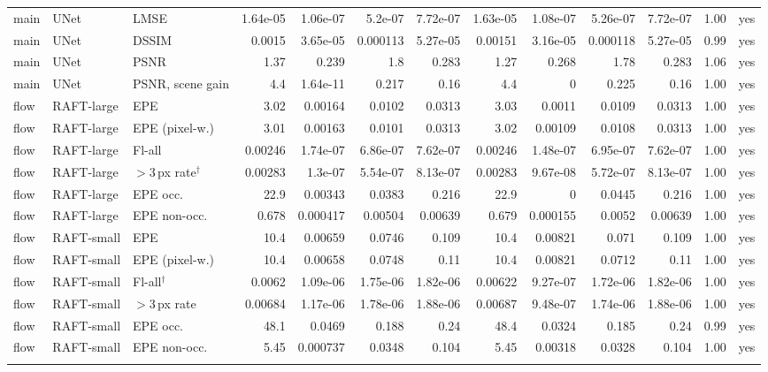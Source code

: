 \begin{table}[!htb]
{\begin{tabular}{lllrrrrrrrrrl}
main & UNet & LMSE & 1.64e-05 & 1.06e-07 & 5.2e-07 & 7.72e-07 & 1.63e-05 & 1.08e-07 & 5.26e-07 & 7.72e-07 & 1.00 & yes \\
main & UNet & DSSIM & 0.0015 & 3.65e-05 & 0.000113 & 5.27e-05 & 0.00151 & 3.16e-05 & 0.000118 & 5.27e-05 & 0.99 & yes \\
main & UNet & PSNR & 1.37 & 0.239 & 1.8 & 0.283 & 1.27 & 0.268 & 1.78 & 0.283 & 1.06 & yes \\
main & UNet & PSNR, scene gain & 4.4 & 1.64e-11 & 0.217 & 0.16 & 4.4 & 0 & 0.225 & 0.16 & 1.00 & yes \\
\addlinespace
flow & RAFT-large & EPE & 3.02 & 0.00164 & 0.0102 & 0.0313 & 3.03 & 0.0011 & 0.0109 & 0.0313 & 1.00 & yes \\
flow & RAFT-large & EPE (pixel-w.) & 3.01 & 0.00163 & 0.0101 & 0.0313 & 3.02 & 0.00109 & 0.0108 & 0.0313 & 1.00 & yes \\
flow & RAFT-large & Fl-all & 0.00246 & 1.74e-07 & 6.86e-07 & 7.62e-07 & 0.00246 & 1.48e-07 & 6.95e-07 & 7.62e-07 & 1.00 & yes \\
flow & RAFT-large & $>$3\,px rate$^\dagger$ & 0.00283 & 1.3e-07 & 5.54e-07 & 8.13e-07 & 0.00283 & 9.67e-08 & 5.72e-07 & 8.13e-07 & 1.00 & yes \\
flow & RAFT-large & EPE occ. & 22.9 & 0.00343 & 0.0383 & 0.216 & 22.9 & 0 & 0.0445 & 0.216 & 1.00 & yes \\
flow & RAFT-large & EPE non-occ. & 0.678 & 0.000417 & 0.00504 & 0.00639 & 0.679 & 0.000155 & 0.0052 & 0.00639 & 1.00 & yes \\
\addlinespace
flow & RAFT-small & EPE & 10.4 & 0.00659 & 0.0746 & 0.109 & 10.4 & 0.00821 & 0.071 & 0.109 & 1.00 & yes \\
flow & RAFT-small & EPE (pixel-w.) & 10.4 & 0.00658 & 0.0748 & 0.11 & 10.4 & 0.00821 & 0.0712 & 0.11 & 1.00 & yes \\
flow & RAFT-small & Fl-all$^\dagger$ & 0.0062 & 1.09e-06 & 1.75e-06 & 1.82e-06 & 0.00622 & 9.27e-07 & 1.72e-06 & 1.82e-06 & 1.00 & yes \\
flow & RAFT-small & $>$3\,px rate & 0.00684 & 1.17e-06 & 1.78e-06 & 1.88e-06 & 0.00687 & 9.48e-07 & 1.74e-06 & 1.88e-06 & 1.00 & yes \\
flow & RAFT-small & EPE occ. & 48.1 & 0.0469 & 0.188 & 0.24 & 48.4 & 0.0324 & 0.185 & 0.24 & 0.99 & yes \\
flow & RAFT-small & EPE non-occ. & 5.45 & 0.000737 & 0.0348 & 0.104 & 5.45 & 0.00318 & 0.0328 & 0.104 & 1.00 & yes \\
\addlinespace
\bottomrule\end{tabular}}\end{table}
